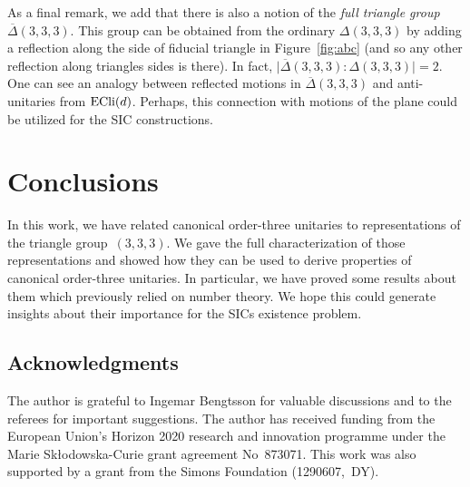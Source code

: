 \documentclass[pdftex]{sigma}
\numberwithin{equation}{section}
\begin{document}
As a final remark, we add that there is also a notion of
the \textit{full triangle group} $\overline{\Delta}(3,3,3)$.
This group can be obtained from the ordinary $\Delta(3,3,3)$
by adding a reflection along the side of fiducial triangle in Figure~\ref{fig:abc}
(and so any other reflection along triangles sides is there).
In fact, $\big|\overline{\Delta}(3,3,3):{\Delta}(3,3,3)\big| = 2$.
One can see an analogy between reflected motions in
$\overline{\Delta}(3,3,3)$ and anti-unitaries from ${\rm ECli}(d)$.
Perhaps, this connection with motions of the plane could be utilized
for the SIC constructions.

\section{Conclusions}

In this work, we have related canonical order-three unitaries
to representations of the triangle group~${(3,3,3)}$.
We gave the full characterization of those representations
and showed how they can be used to derive properties of
canonical order-three unitaries. In particular, we have proved some
results about them which previously relied on number theory.
We hope this could generate insights about their importance for
the SICs existence problem.

\subsection*{Acknowledgments}
The author is grateful to Ingemar Bengtsson for valuable discussions and
to the referees for important suggestions.
 The author has received funding from the European Union's Horizon 2020 research
 and innovation programme under the Marie Sk{\l}odowska-Curie grant agreement No~873071.
This work was also supported by a grant from the Simons Foundation (1290607,~DY).
\end{document}
